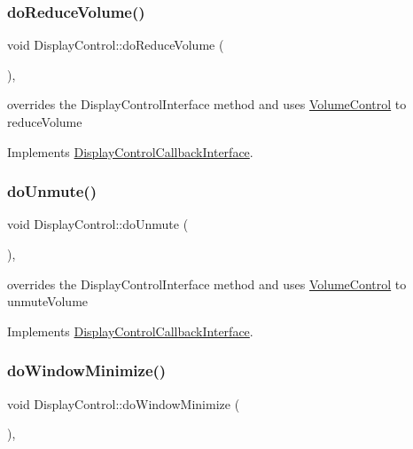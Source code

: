 \subsubsection{\texorpdfstring{do\+Reduce\+Volume()}{doReduceVolume()}}
{\footnotesize\ttfamily void Display\+Control\+::do\+Reduce\+Volume (\begin{DoxyParamCaption}{ }\end{DoxyParamCaption})\hspace{0.3cm}{\ttfamily [override]}, {\ttfamily [virtual]}}

overrides the Display\+Control\+Interface method and uses \hyperlink{classVolumeControl}{Volume\+Control} to reduce\+Volume 

Implements \hyperlink{classDisplayControlCallbackInterface_ac84cb33c6ffa7e818269e664d00fda6d}{Display\+Control\+Callback\+Interface}.

\mbox{\label{classDisplayControl_a210411b559d8c3ffb1498f49cfa26a6d}} 
\subsubsection{\texorpdfstring{do\+Unmute()}{doUnmute()}}
{\footnotesize\ttfamily void Display\+Control\+::do\+Unmute (\begin{DoxyParamCaption}{ }\end{DoxyParamCaption})\hspace{0.3cm}{\ttfamily [override]}, {\ttfamily [virtual]}}

overrides the Display\+Control\+Interface method and uses \hyperlink{classVolumeControl}{Volume\+Control} to unmute\+Volume 

Implements \hyperlink{classDisplayControlCallbackInterface_a24be31ca23631717ac789f2e98467015}{Display\+Control\+Callback\+Interface}.

\mbox{\label{classDisplayControl_ad5fa763a77c680ce7b2089c6d79c4eb7}} 
\subsubsection{\texorpdfstring{do\+Window\+Minimize()}{doWindowMinimize()}}
{\footnotesize\ttfamily void Display\+Control\+::do\+Window\+Minimize (\begin{DoxyParamCaption}{ }\end{DoxyParamCaption})\hspace{0.3cm}{\ttfamily [override]}, {\ttfamily [virtual]}}

